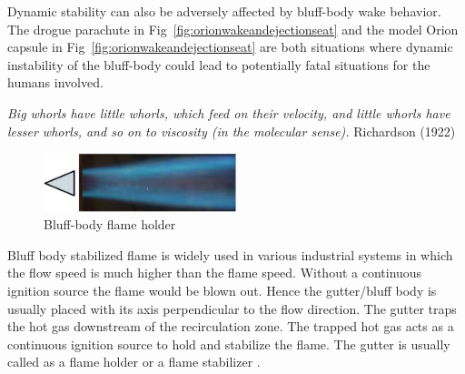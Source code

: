 \documentclass[journal]{new-aiaa}
\begin{document}
Dynamic stability can also be adversely affected by bluff-body wake behavior.  The drogue parachute in Fig~\ref{fig:orionwakeandejectionseat} and the model Orion capsule in Fig~\ref{fig:orionwakeandejectionseat} are both situations where dynamic instability of the bluff-body could lead to potentially fatal situations for the humans involved.









\emph{Big whorls have little whorls, which feed on their velocity, and little whorls have lesser whorls, and so on to viscosity (in the molecular sense).}
Richardson (1922) \cite{richardson1922weather}






\begin{figure}[H]
\begin{center}
\includegraphics[width=0.5\textwidth]{Images/logan/tanaka2013bluff_FlameHolder.pdf}
\caption{ Bluff-body flame holder \cite{tanaka2013bluff} }
\label{fig:flameholder}
\end{center}
\end{figure}


Bluff body stabilized flame is widely used in various industrial systems in which the flow speed is much higher than the flame speed. Without a continuous ignition source the flame would be blown out. Hence the gutter/bluff body is usually placed with its axis perpendicular to the flow direction. The gutter traps the hot gas downstream of the recirculation zone. The trapped hot gas acts as a continuous ignition source to hold and stabilize the flame. The gutter is usually called as a flame holder or a flame stabilizer \cite{li2011large}.
\end{document}
